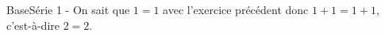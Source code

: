     \setcounter{partie}{0} %
    \partie
    BaseSérie 1 - On sait que $1=1$ avec l’exercice précédent donc $1+1=1+1$,
    c’est-à-dire $2=2$.

    \partie
